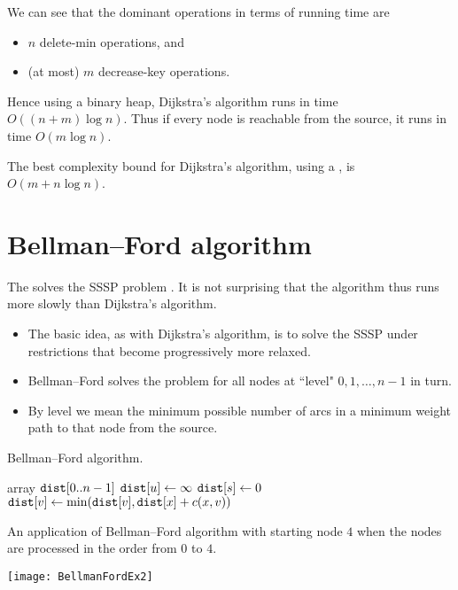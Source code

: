 We can see that the dominant operations in terms of running time are 
\begin{itemize}
\item $n$ delete-min operations, and
\item  (at most) $m$ decrease-key operations. 
\end{itemize}
Hence using a binary heap, Dijkstra's
algorithm runs in time $O((n + m) \log n)$. 
Thus if every node is reachable from the source, it runs in time $O(m \log n)$.

The best complexity bound for Dijkstra's algorithm, using a , is $O(m + n\log n)$.

\section{Bellman--Ford algorithm} \label{sec:bellford}
The  solves the SSSP problem . 
It is not surprising that the algorithm thus runs more slowly than Dijkstra's algorithm. 
\begin{itemize}
  \item The basic idea, as with Dijkstra's algorithm, is to solve the SSSP under restrictions that become progressively more relaxed. 
  \item Bellman--Ford solves the problem for all nodes at ``level" $0, 1, \dots , n-1$ in turn.
  \item By level we mean the minimum possible number of arcs in a minimum weight path to that node from the source.
\end{itemize}

\begin{algorithm}[H]
  \caption{Bellman--Ford algorithm.}
  \label{alg:bellford-code}
\begin{algorithmic}[1]
	\State array $\operatorname{\text{\texttt{dist}}}[0..n-1]$
		\State $\operatorname{\text{\texttt{dist}}}[u] \gets \infty$ 
	\EndFor
	\State $\operatorname{\text{\texttt{dist}}}[s] \gets 0$
				\State $\operatorname{\text{\texttt{dist}}}[v] \gets \min( \operatorname{\text{\texttt{dist}}}[v], \operatorname{\text{\texttt{dist}}}[x] + c(x,v) )$
			\EndFor
		\EndFor
	\EndFor
	\State \Return{$\dist$}
\EndFunction
\end{algorithmic}
\end{algorithm}

\begin{Boxample}[0]
An application of Bellman--Ford algorithm with starting node $4$
when the nodes are processed in the order from $0$ to $4$.
\begin{center} 
  \texttt{[image: BellmanFordEx2]}
\end{center}
\end{Boxample}

